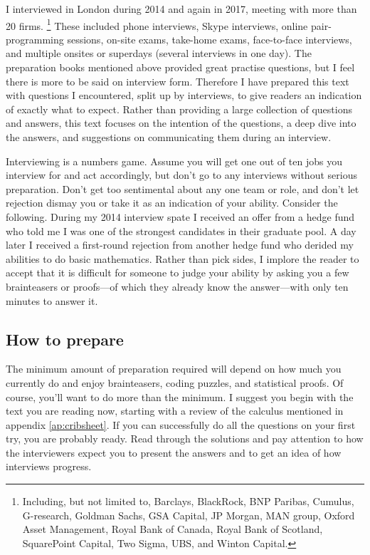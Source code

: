 \documentclass[a4paper]{article}
\begin{document}
I interviewed in London during 2014 and again in 2017,
meeting with more than 20 firms.%
\footnote{Including, but not limited to,
  Barclays,
  BlackRock,
  BNP Paribas,
  Cumulus,
  G-research,
  Goldman Sachs,
  GSA Capital,
  JP Morgan,
  MAN group,
  Oxford Asset Management,
  Royal Bank of Canada,
  Royal Bank of Scotland,
  SquarePoint Capital,
  Two Sigma,
  UBS,
and
  Winton Capital.
}
These included phone interviews, Skype interviews, online pair-programming sessions, on-site exams, take-home exams, face-to-face interviews, and multiple onsites or superdays (several interviews in one day).
The preparation books mentioned above provided great practise questions, but I feel there is more to be said on interview form.
Therefore I have prepared this text with questions I encountered, split up by interviews, to give readers an indication of exactly what to expect.
Rather than providing a large collection of questions and answers, this text focuses on the intention of the questions, a deep dive into the answers, and suggestions on communicating them during an interview.

Interviewing is a numbers game.
Assume you will get one out of ten jobs you interview for and act accordingly, but don't go to any interviews without serious preparation.
Don't get too sentimental about any one team or role, and don't let rejection dismay you or take it as an indication of your ability.
Consider the following.
During my 2014 interview spate I received an offer from a hedge fund who told me I was one of the strongest candidates in their graduate pool.
A day later I received a first-round rejection from another hedge fund who derided my abilities to do basic mathematics.
Rather than pick sides, I implore the reader to accept that it is difficult for someone to judge your ability by asking you a few brainteasers or proofs---of which they already know the answer---with only ten minutes to answer it.

{}
\subsection*{How to prepare}

The minimum amount of preparation required will depend on how much you currently do and enjoy brainteasers, coding puzzles, and statistical proofs.
Of course, you'll want to do more than the minimum.
I suggest you begin with the text you are reading now, starting with a review of the calculus mentioned in appendix \ref{ap:cribsheet}.
If you can successfully do all the questions on your first try, you are probably ready.
Read through the solutions and pay attention to how the interviewers expect you to present the answers and to get an idea of how interviews progress.
\end{document}
